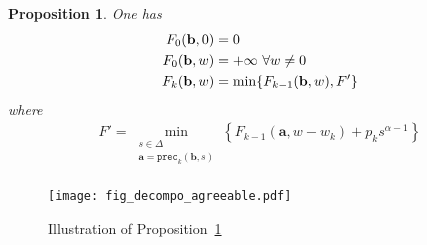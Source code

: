 \documentclass[11pt,a4paper]{article}
\newtheorem{prop}{Proposition}
\newcommand{\vecteur}[1]{\ensuremath{\mathbf{#1}}}
\newcommand{\precedent}{\texttt{prec}}
\begin{document}
\begin{prop}\label{prop_F}
One has
\begin{align*}
F_0(\vecteur{b},0)&=0\notag \\
F_0(\vecteur{b},w)&=+ \infty~\forall w\neq 0 \notag \\
F_k(\vecteur{b},w)
	&=\min \{ F_{k-1}(\vecteur{b},w), F' \}
\end{align*}
where 
\begin{align*}
F' = \min_{
			\substack{
				s\in \Delta\\
				\vecteur{a}=\precedent_k(\vecteur{b},s)	\\
			}
		}
		\left\{
		F_{k-1}(\vecteur{a},w-w_k) 
		+ p_k s^{\alpha-1} 
		\right\}
\end{align*}
\end{prop}


\begin{figure}[ht]
\begin{center}
\texttt{[image: fig\_decompo\_agreeable.pdf]}
\end{center}
\caption{Illustration of Proposition~\ref{prop_F}}
\label{fig_F}
\end{figure}
\end{document}
